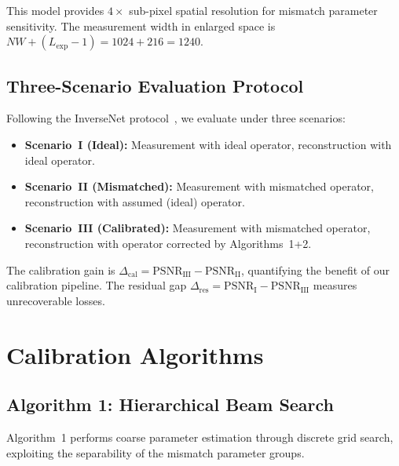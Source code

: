 \documentclass[runningheads]{llncs}
\begin{document}
This model provides $4\times$ sub-pixel spatial resolution for mismatch parameter sensitivity.
The measurement width in enlarged space is $NW + (L_{\text{exp}}-1) = 1024 + 216 = 1240$.

\subsection{Three-Scenario Evaluation Protocol}
\label{sec:protocol}

Following the InverseNet protocol~\cite{yang2025inversenet}, we evaluate under three scenarios:
\begin{itemize}
    \item \textbf{Scenario~I (Ideal):} Measurement with ideal operator, reconstruction with ideal operator.
    \item \textbf{Scenario~II (Mismatched):} Measurement with mismatched operator, reconstruction with assumed (ideal) operator.
    \item \textbf{Scenario~III (Calibrated):} Measurement with mismatched operator, reconstruction with operator corrected by Algorithms~1+2.
\end{itemize}

The calibration gain is $\Delta_{\text{cal}} = \text{PSNR}_{\text{III}} - \text{PSNR}_{\text{II}}$, quantifying the benefit of our calibration pipeline.
The residual gap $\Delta_{\text{res}} = \text{PSNR}_{\text{I}} - \text{PSNR}_{\text{III}}$ measures unrecoverable losses.

\section{Calibration Algorithms}
\label{sec:algorithms}

\subsection{Algorithm 1: Hierarchical Beam Search}
\label{sec:alg1}

Algorithm~1 performs coarse parameter estimation through discrete grid search, exploiting the separability of the mismatch parameter groups.
\end{document}
